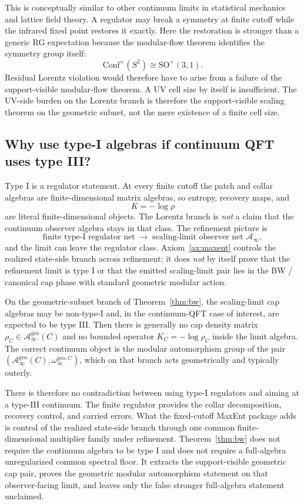 \documentclass[11pt]{article}
\newcommand{\Conf}{\mathrm{Conf}}
\begin{document}
This is conceptually similar to other continuum limits in statistical mechanics and lattice field theory. A regulator may break a symmetry at finite cutoff while the infrared fixed point restores it exactly. Here the restoration is stronger than a generic RG expectation because the modular-flow theorem identifies the symmetry group itself:
\[
\Conf^+(S^2)\cong \mathrm{SO}^+(3,1).
\]
Residual Lorentz violation would therefore have to arise from a failure of the support-visible modular-flow theorem. A UV cell size by itself is insufficient.
The UV-side burden on the Lorentz branch is therefore the support-visible scaling theorem on the geometric subnet, not the mere existence of a finite cell size.

\subsection{Why use type-I algebras if continuum QFT uses type III?}

Type I is a regulator statement. At every finite cutoff the patch and collar algebras are finite-dimensional matrix algebras, so entropy, recovery maps, and
\[
K=-\log\rho
\]
are literal finite-dimensional objects. The Lorentz branch is \emph{not} a claim that the continuum observer algebra stays in that class. The refinement picture is
\[
\text{finite type-I regulator net}
\;\longrightarrow\;
\text{scaling-limit observer net } \mathcal A_\infty,
\]
and the limit can leave the regulator class. Axiom~\ref{ax:maxent} controls the realized state-side branch across refinement; it does \emph{not} by itself prove that the refinement limit is type I or that the emitted scaling-limit pair lies in the BW / canonical cap phase with standard geometric modular action.

On the geometric-subnet branch of Theorem~\ref{thm:bw}, the scaling-limit cap algebras may be non-type-I and, in the continuum-QFT case of interest, are expected to be type III. Then there is generally no cap density matrix \(\rho_C\in \mathcal A_\infty^{\mathrm{geo}}(C)\) and no bounded operator \(K_C=-\log\rho_C\) inside the limit algebra. The correct continuum object is the modular automorphism group of the pair \((\mathcal A_\infty^{\mathrm{geo}}(C),\omega_\infty^{\mathrm{geo},C})\), which on that branch acts geometrically and typically outerly.

There is therefore no contradiction between using type-I regulators and aiming at a type-III continuum. The finite regulator provides the collar decomposition, recovery control, and carried errors. What the fixed-cutoff MaxEnt package adds is control of the realized state-side branch through one common finite-dimensional multiplier family under refinement. Theorem~\ref{thm:bw} does not require the continuum algebra to be type I and does not require a full-algebra unregularized common spectral floor. It extracts the support-visible geometric cap pair, proves the geometric modular automorphism statement on that observer-facing limit, and leaves only the false stronger full-algebra statement unclaimed.
\end{document}
